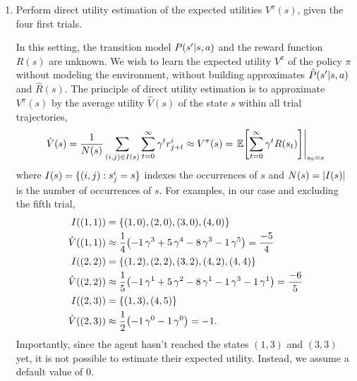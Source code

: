 \documentclass[11pt, a4paper]{article}
\begin{document}
\begin{enumerate}
    \item Perform direct utility estimation of the expected utilities $V^\pi(s)$, given the four first trials.
    
    \begin{solution}
        In this setting, the transition model $P(s' \vert s, a)$ and the reward function $R(s)$ are unknown. We wish to learn the expected utility $V^\pi$ of the policy $\pi$ without modeling the environment, \ie{} without building approximates $\hat{P}(s' \vert s, a)$ and $\hat{R}(s)$. The principle of direct utility estimation is to approximate $V^\pi(s)$ by the average utility $\hat{V}(s)$ of the state $s$ within all trial trajectories, \ie{}
        \begin{equation*}
            \hat{V}(s) = \frac{1}{N(s)} \sum_{(i, j) \in I(s)} \sum_{t = 0}^{\infty} \gamma^t r^i_{j + t} \approx V^\pi(s) = \left. \E \sbk*{\sum_{t = 0}^{\infty} \gamma^t R(s_t)} \right|_{s_0 = s}
        \end{equation*}
        where $I(s) = \{(i, j): s^i_j = s\}$ indexes the occurrences of $s$ and $N(s) = \lvert I(s)\rvert$ is the number of occurrences of $s$. For examples, in our case and excluding the fifth trial,
        \begin{align*}
            I((1, 1)) & = \cbk{(1, 0), (2, 0), (3, 0), (4, 0)} \\
            \hat{V}((1, 1)) & \approx \frac{1}{4} \rbk*{- 1 \, \gamma^3 + 5 \, \gamma^4 - 8 \, \gamma^3 - 1 \, \gamma^5} = \frac{-5}{4} \\
            I((2, 2)) & = \cbk{(1, 2), (2, 2), (3, 2), (4, 2), (4, 4)} \\
            \hat{V}((2, 2)) & \approx \frac{1}{5} \rbk*{- 1 \, \gamma^1 + 5 \, \gamma^2 - 8 \, \gamma^1 - 1 \, \gamma^3 - 1 \, \gamma^1} = \frac{-6}{5} \\
            I((2, 3)) & = \cbk{(1, 3), (4, 5)} \\
            \hat{V}((2, 3)) & \approx \frac{1}{2} \rbk*{- 1 \, \gamma^0 - 1 \, \gamma^0} = -1 .
        \end{align*}
        Importantly, since the agent hasn't reached the states $(1, 3)$ and $(3, 3)$ yet, it is not possible to estimate their expected utility. Instead, we assume a default value of $0$.

        \begin{center}
            \vspace{+1ex}
\end{center}
\end{solution}
\end{enumerate}
\end{document}
